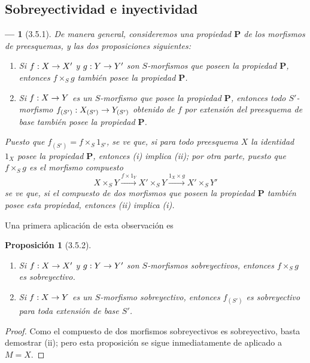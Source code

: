 \documentclass[oneside]{amsart}
\theoremstyle{ega-env-style}
\newtheorem*{env}{---}
\theoremstyle{ega-thm-env-style}
\newtheorem*{proposition}{Proposición}
\theoremstyle{ega-defn-env-style}
\renewcommand{\to}{\mathchoice{\longrightarrow}{\rightarrow}{\rightarrow}{\rightarrow}}
\newcommand{\oldpage}[2][]{{\marginnote{\normalfont{\textbf{#1}~|~#2}}}\ignorespaces}
\let\EGAOriginalLabel\label
\renewcommand{\label}[1]{\phantomsection\EGAOriginalLabel{#1}}
\begin{document}
\subsection{Sobreyectividad e inyectividad}
\label{subsection:I.3.5}

\begin{env}[3.5.1]
\label{I.3.5.1}
De manera general, consideremos una propiedad $\boldsymbol{P}$ de los morfismos de preesquemas, y las dos proposiciones siguientes:
\begin{enumerate}
  \item[\textup{(i)}] \itshape Si $f:X\to X'$ y $g:Y\to Y'$ son $S$-morfismos que poseen la propiedad $\boldsymbol{P}$, entonces $f\times_S g$ también posee la propiedad $\boldsymbol{P}$.
  \upshape\item[\textup{(ii)}] \itshape Si $f:X\to Y$ es un $S$-morfismo que posee la propiedad $\boldsymbol{P}$, entonces todo $S'$-morfismo $f_{(S')}:X_{(S')}\to Y_{(S')}$ obtenido de $f$ por extensión del preesquema de base también posee la propiedad $\boldsymbol{P}$.
\end{enumerate}

\oldpage[I]{115}Puesto que $f_{(S')}=f\times_S 1_{S'}$, se ve que, si para todo preesquema $X$ la \emph{identidad} $1_X$ posee la propiedad $\boldsymbol{P}$, entonces (i) implica (ii); por otra parte, puesto que $f\times_S g$ es el morfismo compuesto
\label{I.3.5.1.product-composition-fr}
\[
  X\times_S Y\xrightarrow{f\times 1_Y}X'\times_S Y
  \xrightarrow{1_X\times g}X'\times_S Y'
\]
se ve que, si el \emph{compuesto} de dos morfismos que poseen la propiedad $\boldsymbol{P}$ también posee esta propiedad, entonces (ii) implica (i).
\end{env}

Una primera aplicación de esta observación es
\begin{proposition}[3.5.2]
\label{I.3.5.2}
\medskip\noindent
\begin{enumerate}
  \item[{\rm(i)}] Si $f:X\to X'$ y $g:Y\to Y'$ son $S$-morfismos sobreyectivos, entonces $f\times_S g$ es sobreyectivo.
  \item[{\rm(ii)}] Si $f:X\to Y$ es un $S$-morfismo sobreyectivo, entonces $f_{(S')}$ es sobreyectivo para toda extensión de base $S'$.
\end{enumerate}
\end{proposition}

\begin{proof}
Como el compuesto de dos morfismos sobreyectivos es sobreyectivo, basta demostrar (ii); pero esta proposición se sigue inmediatamente de  aplicado a $M=X$.
\end{proof}
\end{document}
